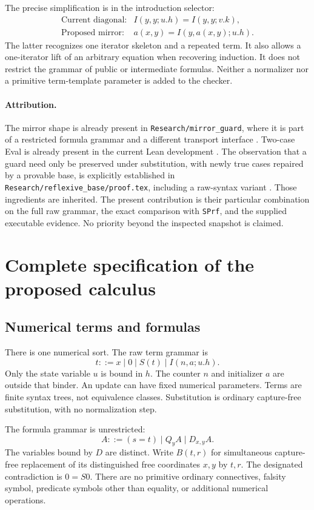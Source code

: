 \documentclass[11pt]{article}
\theoremstyle{definition}\newtheorem{definition}[theorem]{Definition}
\begin{document}
The precise simplification is in the introduction selector:
\[
\begin{array}{ll}
\text{Current diagonal:}&I(y,y;u.h)=I(y,y;v.k),\\[2pt]
\text{Proposed mirror:}&a(x,y)=I(y,a(x,y);u.h).
\end{array}
\]
The latter recognizes one iterator skeleton and a repeated term. It also
allows a one-iterator lift of an arbitrary equation when recovering
induction. It does not restrict the grammar of public or intermediate
formulas. Neither a normalizer nor a primitive term-template parameter
is added to the checker.

\paragraph{Attribution.}
The mirror shape is already present in \texttt{Research/mirror\_guard},
where it is part of a restricted formula grammar and a different
transport interface \cite{mirror}. Two-case Eval is already present in
the current Lean development \cite{six}. The observation that a guard
need only be preserved under substitution, with newly true cases repaired
by a provable base, is explicitly established in
\texttt{Research/reflexive\_base/proof.tex}, including a raw-syntax
variant \cite{reflexive}. Those ingredients are inherited. The present
contribution is their particular combination on the full raw grammar,
the exact comparison with \texttt{SPrf}, and the supplied executable
evidence. No priority beyond the inspected snapshot is claimed.

\section{Complete specification of the proposed calculus}\label{sec:spec}

\subsection{Numerical terms and formulas}
There is one numerical sort. The raw term grammar is
\[
 t ::= x\mid 0\mid S(t)\mid I(n,a;u.h).
\]
Only the state variable $u$ is bound in $h$. The counter $n$ and
initializer $a$ are outside that binder. An update can have fixed
numerical parameters. Terms are finite syntax trees, not equivalence
classes. Substitution is ordinary capture-free substitution, with no
normalization step.

The formula grammar is unrestricted:
\[
 A ::= (s=t)\mid Q_y A\mid D_{x,y}A.
\]
The variables bound by $D$ are distinct. Write $B(t,r)$ for simultaneous
capture-free replacement of its distinguished free coordinates $x,y$ by
$t,r$. The designated contradiction is $0=S0$. There are no primitive
ordinary connectives, falsity symbol, predicate symbols other than
equality, or additional numerical operations.
\end{document}
